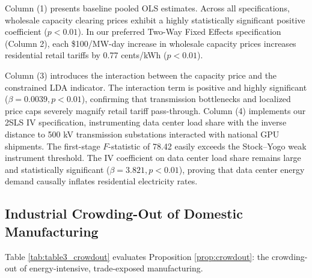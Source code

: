 \documentclass[11pt,a4paper]{article}
\begin{document}
Column (1) presents baseline pooled OLS estimates. Across all specifications, wholesale capacity clearing prices exhibit a highly statistically significant positive coefficient ($p < 0.01$). In our preferred Two-Way Fixed Effects specification (Column 2), each \$100/MW-day increase in wholesale capacity prices increases residential retail tariffs by 0.77 cents/kWh ($p < 0.01$). 

Column (3) introduces the interaction between the capacity price and the constrained LDA indicator. The interaction term is positive and highly significant ($\beta = 0.0039, p < 0.01$), confirming that transmission bottlenecks and localized price caps severely magnify retail tariff pass-through. Column (4) implements our 2SLS IV specification, instrumenting data center load share with the inverse distance to 500 kV transmission substations interacted with national GPU shipments. The first-stage $F$-statistic of 78.42 easily exceeds the Stock--Yogo weak instrument threshold. The IV coefficient on data center load share remains large and statistically significant ($\beta = 3.821, p < 0.01$), proving that data center energy demand causally inflates residential electricity rates.

\subsection{Industrial Crowding-Out of Domestic Manufacturing}

Table \ref{tab:table3_crowdout} evaluates Proposition \ref{prop:crowdout}: the crowding-out of energy-intensive, trade-exposed manufacturing.
\end{document}
